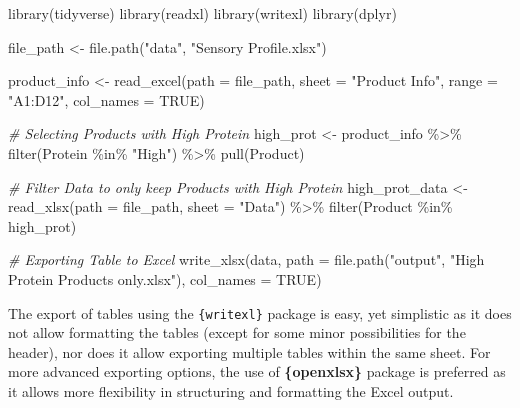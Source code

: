 \documentclass[
]{book}
\newenvironment{Shaded}{\begin{snugshade}}{\end{snugshade}}
\newcommand{\AttributeTok}[1]{\textcolor[rgb]{0.77,0.63,0.00}{#1}}
\newcommand{\CommentTok}[1]{\textcolor[rgb]{0.56,0.35,0.01}{\textit{#1}}}
\newcommand{\ConstantTok}[1]{\textcolor[rgb]{0.00,0.00,0.00}{#1}}
\newcommand{\FunctionTok}[1]{\textcolor[rgb]{0.00,0.00,0.00}{#1}}
\newcommand{\NormalTok}[1]{#1}
\newcommand{\OtherTok}[1]{\textcolor[rgb]{0.56,0.35,0.01}{#1}}
\newcommand{\SpecialCharTok}[1]{\textcolor[rgb]{0.00,0.00,0.00}{#1}}
\newcommand{\StringTok}[1]{\textcolor[rgb]{0.31,0.60,0.02}{#1}}
\begin{document}
\begin{Shaded}
\begin{Highlighting}[]
\FunctionTok{library}\NormalTok{(tidyverse)}
\FunctionTok{library}\NormalTok{(readxl)}
\FunctionTok{library}\NormalTok{(writexl)}
\FunctionTok{library}\NormalTok{(dplyr)}

\NormalTok{file\_path }\OtherTok{\textless{}{-}} \FunctionTok{file.path}\NormalTok{(}\StringTok{"data"}\NormalTok{, }\StringTok{"Sensory Profile.xlsx"}\NormalTok{)}

\NormalTok{product\_info }\OtherTok{\textless{}{-}} \FunctionTok{read\_excel}\NormalTok{(}\AttributeTok{path  =}\NormalTok{ file\_path,}
                           \AttributeTok{sheet =} \StringTok{"Product Info"}\NormalTok{,}
                           \AttributeTok{range =} \StringTok{"A1:D12"}\NormalTok{,}
                           \AttributeTok{col\_names =} \ConstantTok{TRUE}\NormalTok{)}

\CommentTok{\# Selecting Products with High Protein}
\NormalTok{high\_prot }\OtherTok{\textless{}{-}}\NormalTok{ product\_info }\SpecialCharTok{\%\textgreater{}\%} 
  \FunctionTok{filter}\NormalTok{(Protein }\SpecialCharTok{\%in\%} \StringTok{"High"}\NormalTok{) }\SpecialCharTok{\%\textgreater{}\%} 
  \FunctionTok{pull}\NormalTok{(Product)}

\CommentTok{\# Filter Data to only keep Products with High Protein}
\NormalTok{high\_prot\_data }\OtherTok{\textless{}{-}} \FunctionTok{read\_xlsx}\NormalTok{(}\AttributeTok{path =}\NormalTok{ file\_path,}
                  \AttributeTok{sheet =} \StringTok{"Data"}\NormalTok{) }\SpecialCharTok{\%\textgreater{}\%} 
  \FunctionTok{filter}\NormalTok{(Product }\SpecialCharTok{\%in\%}\NormalTok{ high\_prot)}

\CommentTok{\# Exporting Table to Excel}
\FunctionTok{write\_xlsx}\NormalTok{(data, }
           \AttributeTok{path =} \FunctionTok{file.path}\NormalTok{(}\StringTok{"output"}\NormalTok{, }\StringTok{"High Protein Products only.xlsx"}\NormalTok{),}
           \AttributeTok{col\_names =} \ConstantTok{TRUE}\NormalTok{)}
\end{Highlighting}
\end{Shaded}

The export of tables using the \texttt{\{writexl\}} package is easy, yet simplistic as it does not allow formatting the tables (except for some minor possibilities for the header), nor does it allow exporting multiple tables within the same sheet. For more advanced exporting options, the use of \textbf{\{openxlsx\}} package is preferred as it allows more flexibility in structuring and formatting the Excel output.
\end{document}
